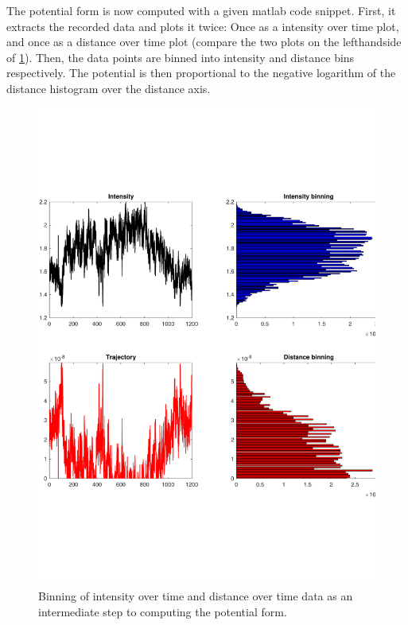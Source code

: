 \documentclass[../bericht.tex]{subfiles}
\begin{document}
      \medskip

      The potential form is now computed with a given matlab code snippet. First, it extracts the recorded data and plots it twice: Once as a intensity over time plot, and once as a distance over time plot (compare the two plots on the lefthandside of \cref{fig:pot-deriv}). Then, the data points are binned into intensity and distance bins respectively. The potential is then proportional to the negative logarithm of the distance histogram over the distance axis.

      \begin{figure}[htb]
        \centering
        \includegraphics[width=\textwidth]{figures/75intensity_trajectory.pdf}
        \caption{Binning of intensity over time and distance over time data as an intermediate step to computing the potential form.}
        \label{fig:pot-deriv}
      \end{figure}
\end{document}

